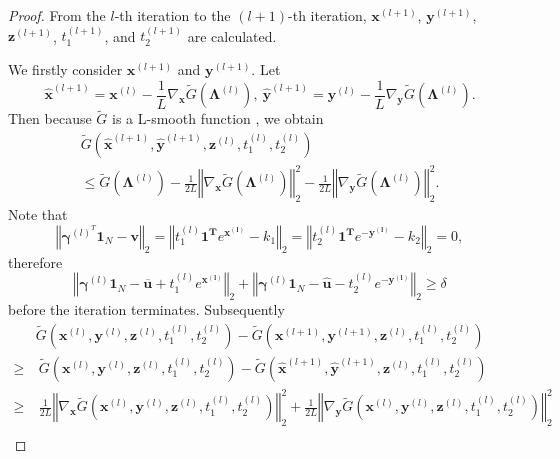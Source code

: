\documentclass[review,hidelinks,onefignum,onetabnum]{siamart220329}
\begin{document}
\begin{proof}
From the $l$-th iteration to the $(l+1)$-th iteration, $\bm{x}^{(l+1)}$, $\bm{y}^{(l+1)}$, $\bm{z}^{(l+1)}$, $t_1^{(l+1)}$, and $ t_2^{(l+1)}$ are calculated.

We firstly consider $\bm{x}^{(l+1)}$ and $\bm{y}^{(l+1)}$. 
Let
$$\bm{\hat{x}}^{(l+1)}=\bm{x}^{(l)}-\frac{1}{L}\nabla_{\bm{x}}\widetilde{G}\left(\bm{\Lambda}^{(l)}\right), \ \bm{\hat{y}}^{(l+1)}=\bm{y}^{(l)}-\frac{1}{L}\nabla_{\bm{y}}\widetilde{G}\left(\bm{\Lambda}^{(l)}\right).$$ 
Then because $ \widetilde{G}$ is a L-smooth function \cite{beck2017first}, we obtain
\begin{multline*}
    \widetilde{G}\left(\bm{\hat{x}}^{(l+1)},\bm{\hat{y}}^{(l+1)},\bm{z}^{(l)},t_1^{(l)},t_2^{(l)}\right) \\
    \leq  \widetilde{G}\left( \bm{\Lambda}^{(l)} \right) - \frac{1}{2L} \left\Vert \nabla_{\bm{x}}\widetilde{G}\left(\bm{\Lambda}^{(l)}\right) \right\Vert_2^2-\frac{1}{2L}\left\Vert \nabla_{\bm{y}}\widetilde{G}\left(\bm{\Lambda}^{(l)}\right)\right\Vert_2^2.
\end{multline*}
Note that 
$$ \left\Vert \bm{\gamma}^{(l)^T}\bm{1}_N-\bm{v} \right\Vert_2= \left\Vert t_1^{(l)} \bm{1^T}e^{\bm{x^{(l)}}}-k_1 \right\Vert_2 = \left\Vert t_2^{(l)} \bm{1^T}e^{-\bm{y^{(l)}}}-k_2 \right\Vert_2 = 0,$$ 
therefore 
\begin{equation*}
    \left\Vert \bm{\gamma}^{(l)}\bm{1}_N-\bm{\overline{u}}+t_1^{(l)} e^{\bm{x^{(l)}}} \right\Vert_2 + \left\Vert \bm{\gamma}^{(l)}\bm{1}_N-\bm{\hat{u}}-t_2^{(l)} e^{\bm{-y^{(l)}}} \right\Vert_2 \geq \delta 
\end{equation*}
before the iteration terminates. Subsequently 
\begin{equation*}
    \begin{aligned}
        & \widetilde{G}\left(\bm{x}^{(l)},\bm{y}^{(l)}, \bm{z}^{(l)}, t_1^{(l)},t_2^{(l)} \right) -\widetilde{G}\left(\bm{x}^{(l+1)},\bm{y}^{(l+1)},\bm{z}^{(l)},t_1^{(l)},t_2^{(l)}\right) \\
        \geq & \  \widetilde{G}\left(\bm{x}^{(l)},\bm{y}^{(l)},\bm{z}^{(l)},t_1^{(l)},t_2^{(l)}\right)-\widetilde{G}\left(\bm{\hat{x}}^{(l+1)},\bm{\hat{y}}^{(l+1)},\bm{z}^{(l)},t_1^{(l)},t_2^{(l)}\right)\\
        \geq & \ \frac{1}{2L}\left\Vert \nabla_{\bm{x}}\widetilde{G}\left(\bm{x}^{(l)},\bm{y}^{(l)},\bm{z}^{(l)},t_1^{(l)},t_2^{(l)}\right)\right\Vert_2^2+\frac{1}{2L}\left\Vert \nabla_{\bm{y}}\widetilde{G}\left(\bm{x}^{(l)},\bm{y}^{(l)},\bm{z}^{(l)},t_1^{(l)},t_2^{(l)}\right)\right\Vert_2^2\\

\end{aligned}
\end{equation*}
\end{proof}
\end{document}

